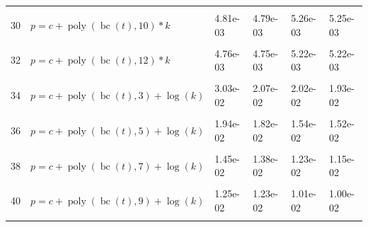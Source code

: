 \documentclass[12pt,a4paper]{article}
\DeclareMathOperator{\bc}{bc}
\DeclareMathOperator{\poly}{poly}
\begin{document}
\begin{longtable}[t]{ll>{\raggedleft\arraybackslash}p{2cm}>{\raggedleft\arraybackslash}p{2cm}>{\raggedleft\arraybackslash}p{2cm}>{\raggedleft\arraybackslash}p{2cm}}
\cellcolor{gray!6}{29} & \cellcolor{gray!6}{$p = c + \poly\left( \bc(t), 9 \right) * k$} & \cellcolor{gray!6}{5.23e-03} & \cellcolor{gray!6}{5.10e-03} & \cellcolor{gray!6}{5.55e-03} & \cellcolor{gray!6}{5.49e-03}\\
30 & $p = c + \poly\left( \bc(t), 10 \right) * k$ & 4.81e-03 & 4.79e-03 & 5.26e-03 & 5.25e-03\\
\cellcolor{gray!6}{31} & \cellcolor{gray!6}{$p = c + \poly\left( \bc(t), 11 \right) * k$} & \cellcolor{gray!6}{4.79e-03} & \cellcolor{gray!6}{4.78e-03} & \cellcolor{gray!6}{5.24e-03} & \cellcolor{gray!6}{5.23e-03}\\
32 & $p = c + \poly\left( \bc(t), 12 \right) * k$ & 4.76e-03 & 4.75e-03 & 5.22e-03 & 5.22e-03\\
\cellcolor{gray!6}{33} & \cellcolor{gray!6}{$p = c + \poly\left( \bc(t), 13 \right) * k$} & \cellcolor{gray!6}{4.75e-03} & \cellcolor{gray!6}{4.75e-03} & \cellcolor{gray!6}{5.22e-03} & \cellcolor{gray!6}{5.22e-03}\\
34 & $p = c + \poly\left( \bc(t), 3 \right) + \log(k)$ & 3.03e-02 & 2.07e-02 & 2.02e-02 & 1.93e-02\\
\cellcolor{gray!6}{35} & \cellcolor{gray!6}{$p = c + \poly\left( \bc(t), 4 \right) + \log(k)$} & \cellcolor{gray!6}{2.23e-02} & \cellcolor{gray!6}{2.10e-02} & \cellcolor{gray!6}{2.11e-02} & \cellcolor{gray!6}{2.05e-02}\\
36 & $p = c + \poly\left( \bc(t), 5 \right) + \log(k)$ & 1.94e-02 & 1.82e-02 & 1.54e-02 & 1.52e-02\\
\cellcolor{gray!6}{37} & \cellcolor{gray!6}{$p = c + \poly\left( \bc(t), 6 \right) + \log(k)$} & \cellcolor{gray!6}{1.56e-02} & \cellcolor{gray!6}{1.48e-02} & \cellcolor{gray!6}{1.19e-02} & \cellcolor{gray!6}{1.18e-02}\\
38 & $p = c + \poly\left( \bc(t), 7 \right) + \log(k)$ & 1.45e-02 & 1.38e-02 & 1.23e-02 & 1.15e-02\\
\cellcolor{gray!6}{39} & \cellcolor{gray!6}{$p = c + \poly\left( \bc(t), 8 \right) + \log(k)$} & \cellcolor{gray!6}{1.26e-02} & \cellcolor{gray!6}{1.24e-02} & \cellcolor{gray!6}{1.00e-02} & \cellcolor{gray!6}{1.00e-02}\\
40 & $p = c + \poly\left( \bc(t), 9 \right) + \log(k)$ & 1.25e-02 & 1.23e-02 & 1.01e-02 & 1.00e-02\\
\cellcolor{gray!6}{41} & \cellcolor{gray!6}{$p = c + \poly\left( \bc(t), 10 \right) + \log(k)$} & \cellcolor{gray!6}{1.24e-02} & \cellcolor{gray!6}{1.23e-02} & \cellcolor{gray!6}{9.96e-03} & \cellcolor{gray!6}{9.93e-03}\\

\end{longtable}
\end{document}

